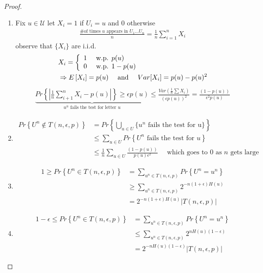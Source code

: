 \documentclass{article}
\theoremstyle{definition} %
\renewcommand{\Pr}[1]{Pr\left\{#1\right\}}
\newcommand{\Ex}[1]{E\left[#1\right]}
\def\U{\mathcal{U}}
\begin{document}
\begin{proof}
  \begin{enumerate}
    \item
    Fix $u \in \U$ let $X_i = 1$ if $ U_i = u$ and $0$ otherwise
    \begin{align*}
      \frac{\text{\# of times } u \text{ appears in } U_1 ... U_n}{n} = \frac{1}{n} \sum_{i = 1}^n X_i
    \end{align*}
    observe that $\{ X_i \}$ are i.i.d.
    \begin{align*}
      &X_i =
      \left\{
        \begin{array}{l l}
          1 & \text{ w.p. } p(u) \\
          0 & \text{ w.p. } 1 - p(u)
        \end{array}
      \right. \\
      &\Rightarrow \Ex{X_i} = p(u) \quad \text{ and } \quad Var[X_i] = p(u) - p(u)^2 \\
    \end{align*}
    \begin{align*}
      \underbrace{
        \Pr{|\frac{1}{n} \sum_{i+1}^n X_i - p(u)|}\geq \epsilon p(u)
      }_{u^n \text{ fails the test for letter } u}
      \leq
      \frac{Var(\frac{1}{n} \sum X_i)}{(\epsilon p(u))^2}
      = \frac{(1 - p(u))}{\epsilon^2 p(u)}
    \end{align*}

    \item
    \begin{align*}
      \Pr{U^n \not \in T(n, \epsilon, p)} &= \Pr{\bigcup_{u \in U} \{u^n \text{ fails the test for u} \}} \\
      &\leq \sum_{u \in U} \Pr{U^n \text{ fails the test for } u} \\
      &\leq \frac{1}{n} \sum_{u \in U} \frac{(1 - p(u))}{p(u) \epsilon^2} \quad \text{ which goes to 0 as } n \text{ gets large}
    \end{align*}

    \item
    \begin{align*}
      1 \geq \Pr{U^n \in T(n, \epsilon, p)} &= \sum_{u^n \in T(n, \epsilon, p)} \Pr{U^n = u^n} \\
      &\geq \sum_{u^n \in T(n, \epsilon, p)} 2^{-n(1 + \epsilon) H(u)} \\
      &= 2^{-n (1 + \epsilon) H(u)} |T(n, \epsilon, p)|
    \end{align*}

    \item
    \begin{align*}
      1 - \epsilon \leq \Pr{U^n \in T(n, \epsilon, p)} &= \sum_{u^n \in T(n, \epsilon, p)} \Pr{U^n = u^n} \\
       &\leq \sum_{u^n \in T(n, \epsilon, p)} 2^{n H(u)(1-\epsilon)} \\
       &= 2^{-n H(u)(1 - \epsilon)} |T(n, \epsilon, p)|
    \end{align*}

  \end{enumerate}
\end{proof}
\end{document}
